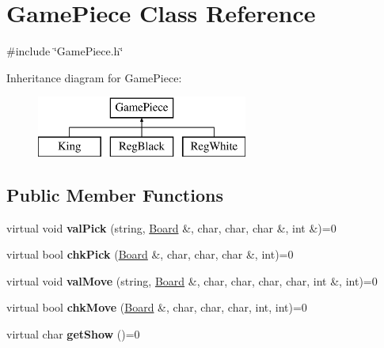 \hypertarget{class_game_piece}{\section{Game\-Piece Class Reference}
\label{class_game_piece}
}


{\ttfamily \#include \char`\"{}Game\-Piece.\-h\char`\"{}}

Inheritance diagram for Game\-Piece\-:\begin{figure}[H]
\begin{center}
\leavevmode
\includegraphics[height=2.000000cm]{class_game_piece}
\end{center}
\end{figure}
\subsection*{Public Member Functions}
\begin{DoxyCompactItemize}
\item 
\hypertarget{class_game_piece_a595e9a724c19032fddf1b7b09e3a2bf3}{virtual void {\bfseries val\-Pick} (string, \hyperlink{class_board}{Board} \&, char, char, char \&, int \&)=0}\label{class_game_piece_a595e9a724c19032fddf1b7b09e3a2bf3}

\item 
\hypertarget{class_game_piece_af13687186a04d74491d55b9b621b6160}{virtual bool {\bfseries chk\-Pick} (\hyperlink{class_board}{Board} \&, char, char, char \&, int)=0}\label{class_game_piece_af13687186a04d74491d55b9b621b6160}

\item 
\hypertarget{class_game_piece_a400d161120b2a454e82861c7d1ee5964}{virtual void {\bfseries val\-Move} (string, \hyperlink{class_board}{Board} \&, char, char, char, char, int \&, int)=0}\label{class_game_piece_a400d161120b2a454e82861c7d1ee5964}

\item 
\hypertarget{class_game_piece_af4a749318d78a0d6bf2480d06aa3d634}{virtual bool {\bfseries chk\-Move} (\hyperlink{class_board}{Board} \&, char, char, char, int, int)=0}\label{class_game_piece_af4a749318d78a0d6bf2480d06aa3d634}

\item 
\hypertarget{class_game_piece_a6dc3bed526398628e7a18ff8bad5b58e}{virtual char {\bfseries get\-Show} ()=0}\label{class_game_piece_a6dc3bed526398628e7a18ff8bad5b58e}

\end{DoxyCompactItemize}
